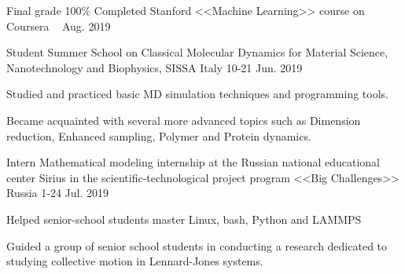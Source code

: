

\begin{cventries}

  \cventry
    {Final grade 100\%} %
    {Completed Stanford <<Machine Learning>> course on Coursera} %
    {~} %
    {Aug. 2019} %
    {
      \begin{cvitems} %
      \end{cvitems}
    }

  \cventry
    {Student} %
    {Summer School on Classical Molecular Dynamics for Material Science, Nanotechnology and Biophysics, SISSA} %
    {Italy} %
    {10-21 Jun. 2019} %
    {
      \begin{cvitems} %
        \item {Studied and practiced basic MD simulation techniques and programming tools.}
        \item {Became acquainted with several more advanced topics such as Dimension reduction, Enhanced sampling, Polymer and Protein dynamics.}
      \end{cvitems}
    }

  \cventry
    {Intern} %
    {Mathematical modeling internship at the Russian national educational center Sirius in the scientific-technological project program <<Big Challenges>>} %
    {Russia} %
    {1-24 Jul. 2019} %
    {
      \begin{cvitems} %
        \item {Helped senior-school students master Linux, bash, Python and LAMMPS}
        \item {Guided a group of senior school students in conducting a research dedicated to studying collective motion in Lennard-Jones systems.}
      \end{cvitems}
    }

\end{cventries}
